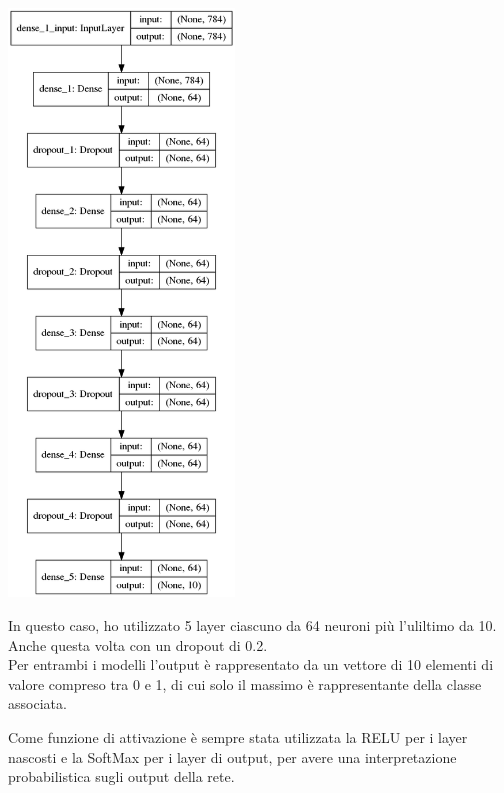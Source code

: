 \documentclass[12pt]{article}
\begin{document}
\begin{multicols}{2}
    \bigskip
    \noindent
    \begin{minipage}{\linewidth}
        \centering
        \includegraphics[width=6cm]{../mnist_models/MLPNN_type1-batch128-balanced/model.png}
        \label{fig:cc}
    \end{minipage}
    \bigskip

    In questo caso, ho utilizzato 5 layer ciascuno da 64 neuroni più l'uliltimo da 10. 
    Anche questa volta con un dropout di 0.2.\\


    Per entrambi i modelli l'output è rappresentato da un vettore di 10 elementi
    di valore compreso tra 0 e 1, di cui solo il massimo è rappresentante della
    classe associata.\\

\end{multicols}

    Come funzione di attivazione è sempre stata utilizzata la RELU per i layer nascosti
    e la SoftMax per i layer di output, per avere una interpretazione probabilistica
    sugli output della rete.
\end{document}
